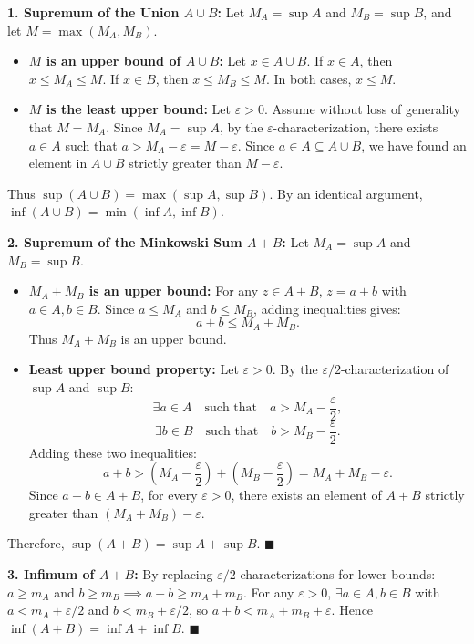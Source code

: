 \begin{solution}
\textbf{1. Supremum of the Union $A \cup B$:}
Let $M_A = \sup A$ and $M_B = \sup B$, and let $M = \max(M_A, M_B)$.
\begin{itemize}[leftmargin=1.5em,itemsep=2pt]
  \item \textbf{$M$ is an upper bound of $A \cup B$:} Let $x \in A \cup B$.
  If $x \in A$, then $x \le M_A \le M$.
  If $x \in B$, then $x \le M_B \le M$.
  In both cases, $x \le M$.
  \item \textbf{$M$ is the least upper bound:} Let $\varepsilon > 0$.
  Assume without loss of generality that $M = M_A$.
  Since $M_A = \sup A$, by the $\varepsilon$-characterization, there exists $a \in A$ such that $a > M_A - \varepsilon = M - \varepsilon$.
  Since $a \in A \subseteq A \cup B$, we have found an element in $A \cup B$ strictly greater than $M - \varepsilon$.
\end{itemize}
Thus $\sup(A \cup B) = \max(\sup A, \sup B)$. By an identical argument, $\inf(A \cup B) = \min(\inf A, \inf B)$.

\textbf{2. Supremum of the Minkowski Sum $A + B$:}
Let $M_A = \sup A$ and $M_B = \sup B$.
\begin{itemize}[leftmargin=1.5em,itemsep=2pt]
  \item \textbf{$M_A + M_B$ is an upper bound:} For any $z \in A + B$, $z = a + b$ with $a \in A, b \in B$.
  Since $a \le M_A$ and $b \le M_B$, adding inequalities gives:
  \[
  a + b \le M_A + M_B.
  \]
  Thus $M_A + M_B$ is an upper bound.
  \item \textbf{Least upper bound property:} Let $\varepsilon > 0$.
  By the $\varepsilon/2$-characterization of $\sup A$ and $\sup B$:
  \[
  \exists a \in A \quad \text{such that} \quad a > M_A - \frac{\varepsilon}{2},
  \]
  \[
  \exists b \in B \quad \text{such that} \quad b > M_B - \frac{\varepsilon}{2}.
  \]
  Adding these two inequalities:
  \[
  a + b > \left(M_A - \frac{\varepsilon}{2}\right) + \left(M_B - \frac{\varepsilon}{2}\right) = M_A + M_B - \varepsilon.
  \]
  Since $a + b \in A + B$, for every $\varepsilon > 0$, there exists an element of $A + B$ strictly greater than $(M_A + M_B) - \varepsilon$.
\end{itemize}
Therefore, $\sup(A + B) = \sup A + \sup B$. \hfill $\blacksquare$

\textbf{3. Infimum of $A + B$:}
By replacing $\varepsilon/2$ characterizations for lower bounds:
$a \ge m_A$ and $b \ge m_B \implies a + b \ge m_A + m_B$.
For any $\varepsilon > 0$, $\exists a \in A, b \in B$ with $a < m_A + \varepsilon/2$ and $b < m_B + \varepsilon/2$, so $a + b < m_A + m_B + \varepsilon$.
Hence $\inf(A + B) = \inf A + \inf B$. \hfill $\blacksquare$
\end{solution}

